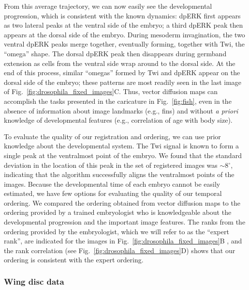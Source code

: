 \documentclass[twocolumn, 10pt]{article}
\newcommand{\fig}[0]{Fig.}
\begin{document}
From this average trajectory, we can now easily see the developmental progression, which is consistent with the known dynamics: 
dpERK first appears as two lateral peaks at the ventral side of the embryo; a third dpERK peak then appears at the dorsal side of the embryo.
%
During mesoderm invagination, the two ventral dpERK peaks merge together, eventually forming, together with Twi, the ``omega'' shape.
%
The dorsal dpERK peak then disappears during germband extension as cells from the ventral side wrap around to the dorsal side.
%
At the end of this process, similar ``omegas'' formed by Twi and dpERK appear on the dorsal side of the embryo; these patterns are most readily seen in the last image of \fig~\ref{fig:drosophila_fixed_images}C.
%
Thus, vector diffusion maps can accomplish the tasks presented in the caricature in \fig~\ref{fig:fish}, even in the absence of information about image landmarks (e.g., fins) and without {\it a priori} knowledge of developmental features (e.g., correlation of age with body size).
%

To evaluate the quality of our registration and ordering, we can use prior knowledge about the developmental system. 
%
The Twi signal is known to form a single peak at the ventralmost point of the embryo. 
%
We found that the standard deviation in the location of this peak in the set of registered images was $\sim$8$^\circ$,
indicating that the algorithm successfully aligns the ventralmost points of the images. 
%
Because the developmental time of each embryo cannot be easily estimated, we have few options for evaluating the quality of our temporal ordering. 
%
We compared the ordering obtained from vector diffusion maps to the ordering provided by a trained embryologist who is knowledgeable about the developmental progression and the important image features.  
%
The ranks from the ordering provided by the embryologist, which we will refer to as the ``expert rank'', are indicated for the images in \fig~\ref{fig:drosophila_fixed_images}B , and the rank correlation (see \fig~\ref{fig:drosophila_fixed_images}D) shows that our ordering is consistent with the expert ordering. 


\subsubsection*{Wing disc data}
\end{document}

